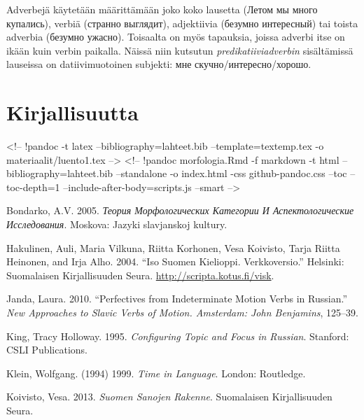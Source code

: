 \documentclass[]{scrreprt}
\begin{document}
Adverbejä käytetään määrittämään joko koko lausetta (Летом мы много
купались), verbiä (странно выглядит), adjektiivia (безумно интересный)
tai toista adverbia (безумно ужасно). Toisaalta on myös tapauksia,
joissa adverbi itse on ikään kuin verbin paikalla. Näissä niin kutsutun
\emph{predikatiiviadverbin} sisältämissä lauseissa on datiivimuotoinen
subjekti: мне скучно/интересно/хорошо.

\chapter*{Kirjallisuutta}\label{kirjallisuutta}

\textless{}!-- !pandoc -t latex --bibliography=lahteet.bib
--template=textemp.tex -o materiaalit/luento1.tex --\textgreater{}
\textless{}!-- !pandoc morfologia.Rmd -f markdown -t html
--bibliography=lahteet.bib --standalone -o index.html -css
github-pandoc.css --toc --toc-depth=1 --include-after-body=scripts.js
--smart --\textgreater{} \\

Bondarko, A.V. 2005. \emph{Теория Морфологических Категории И
Аспектологические Исследования}. Moskova: Jazyki slavjanskoj kultury. \\

Hakulinen, Auli, Maria Vilkuna, Riitta Korhonen, Vesa Koivisto, Tarja
Riitta Heinonen, and Irja Alho. 2004. ``Iso Suomen Kielioppi.
Verkkoversio.'' Helsinki: Suomalaisen Kirjallisuuden Seura.
\url{http://scripta.kotus.fi/visk}. \\

Janda, Laura. 2010. ``Perfectives from Indeterminate Motion Verbs in
Russian.'' \emph{New Approaches to Slavic Verbs of Motion. Amsterdam:
John Benjamins}, 125--39. \\

King, Tracy Holloway. 1995. \emph{Configuring Topic and Focus in
Russian}. Stanford: CSLI Publications. \\

Klein, Wolfgang. (1994) 1999. \emph{Time in Language}. London:
Routledge. \\

Koivisto, Vesa. 2013. \emph{Suomen Sanojen Rakenne}. Suomalaisen
Kirjallisuuden Seura. \\
\end{document}
